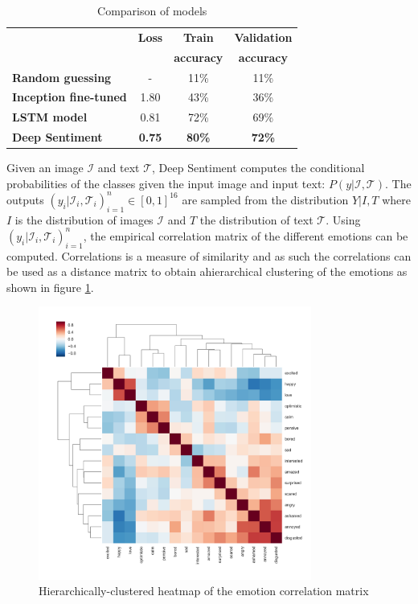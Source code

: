 \documentclass{article} %
\begin{document}
\begin{table}[H]
\caption{Comparison of models}
\begin{center}
    \begin{tabular}{ l | c | c | c}
    & \textbf{Loss} & \textbf{Train} & \textbf{Validation} \\
    & & \textbf{accuracy} & \textbf{accuracy} \\ \hline
    \textbf{Random guessing} & - & 11\% & 11\% \\ \hline
    \textbf{Inception fine-tuned}  & 1.80 & 43\% & 36\% \\ \hline
    \textbf{LSTM model} & 0.81 & 72\% & 69\% \\ \hline
    \textbf{Deep Sentiment} & \textbf{0.75} & \textbf{80\%} & \textbf{72\%} \\
    \end{tabular}
\end{center} 
\label{all-results}
\end{table}

Given an image $\mathcal{I}$ and text $\mathcal{T}$, Deep Sentiment computes the conditional probabilities of the classes given the input image and input text: $P(y | \mathcal{I}, \mathcal{T})$. The outputs $(y_i | \mathcal{I}_i, \mathcal{T}_i)_{i=1}^n \in [0,1]^{16}$ are sampled from the distribution $Y| I, T$ where $I$ is the distribution of images $\mathcal{I}$ and $T$ the distribution of text $\mathcal{T}$. Using $(y_i | \mathcal{I}_i, \mathcal{T}_i)_{i=1}^n$, the empirical correlation matrix of the different emotions can be computed. Correlations is a measure of similarity and as such the correlations can be used as a distance matrix to obtain ahierarchical clustering of the emotions as shown in figure \ref{dendrogram}.

\begin{figure}[H]
    \centering
    \includegraphics[width=0.8\textwidth]{Images/dendrogram.jpg}
    \caption{Hierarchically-clustered heatmap of the emotion correlation matrix}
    \label{dendrogram}
\end{figure}
\end{document}
